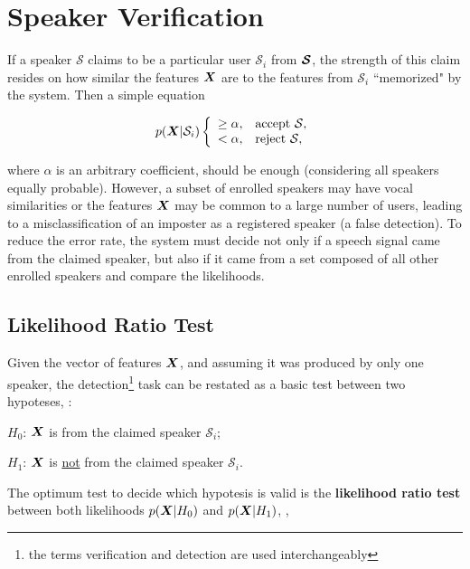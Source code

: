 \section{Speaker Verification}
\label{sec:speaker-verification}

If a speaker $\mathcal{S}$ claims to be a particular user $\mathcal{S}_i$ from $\boldsymbol{\mathcal{S}}$, the strength of this claim resides on how similar the features $\boldsymbol{X}$ are to the features from $\mathcal{S}_i$ ``memorized" by the system. Then a simple equation

\begin{equation}
    \postpdf{\boldsymbol{X}}{\mathcal{S}_i} \verifytestB{\alpha}{\mathcal{S}}
    \label{eq:decision_speaker_verification}
\end{equation}

\noindent where $\alpha$ is an arbitrary coefficient, should be enough (considering all speakers equally probable). However, a subset of enrolled speakers may have vocal similarities or the features $\boldsymbol{X}$ may be common to a large number of users, leading to a misclassification of an imposter as a registered speaker (a false detection). To reduce the error rate, the system must decide not only if a speech signal came from the claimed speaker, but also if it came from a set composed of all other enrolled speakers and compare the likelihoods.

\subsection{Likelihood Ratio Test}

Given the vector of features $\boldsymbol{X}$, and assuming it was produced by only one speaker, the detection\footnote{the terms verification and detection are used interchangeably} task can be restated as a basic test between two hypoteses, :

\begin{description}\itemsep0pt
    \item $H_0$: $\boldsymbol{X}$ is from the claimed speaker $\mathcal{S}_i$;
    \item $H_1$: $\boldsymbol{X}$ is \underline{not} from the claimed speaker $\mathcal{S}_i$.
\end{description}

\noindent The optimum test to decide which hypotesis is valid is the \textbf{likelihood ratio test} between both likelihoods $p(\boldsymbol{X}|H_0)$ and $p(\boldsymbol{X}|H_1)$, ,

